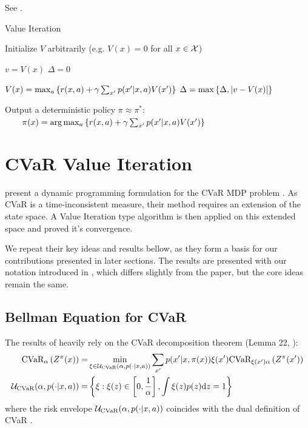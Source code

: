 See .


\begin{algorithm}
\caption{Value Iteration}
\label{alg:vi}
\begin{algorithmic}
    \STATE Initialize $V$ arbitrarily (e.g. $V(x)=0$ for all $x \in \mathcal{X}$)
    
	\REPEAT
	
	\STATE $v = V(x)$
	\STATE $\Delta = 0$
	
	\STATE $V(x) = \max_a\left\{ {r(x, a) + \gamma\sum_{x'}p(x'|x, a)V(x')} \right\}$
	\STATE $\Delta = \max\left\{ {\Delta, |v-V(x)|} \right\}$
	\ENDFOR
	
	\UNTIL{ $\Delta < \epsilon$ }
	
	\STATE Output a deterministic policy $\pi \approx \pi^*$:
   	\STATE $\quad\quad \pi(x) = \text{arg}\max_a\left\{ {r(x, a) + \gamma\sum_{x'}p(x'|x, a)V(x')} \right\}$
\end{algorithmic}
\end{algorithm}


\section{CVaR Value Iteration}\label{sec:vi:cvar}

\citet{chow2015risk} present a dynamic programming formulation for the CVaR MDP problem . As CVaR is a time-inconsistent measure, their method requires an extension of the state space. A Value Iteration type algorithm is then applied on this extended space and \citet{chow2015risk} proved it's convergence. 

We repeat their key ideas and results bellow, as they form a basis for our contributions presented in later sections. The results are presented with our notation introduced in , which differs slightly from the paper, but the core ideas remain the same.

\subsection{Bellman Equation for CVaR}

The results of \citet{chow2015risk} heavily rely on the CVaR decomposition theorem (Lemma 22, \citep{pflug2016time}):
%
\begin{equation}\label{eqn:cvardecomp}
\begin{split}
\text{CVaR}_\alpha\left( {Z^\pi(x)} \right) =& \min_{\xi \in \mathcal{U}_{\text{CVaR}}(\alpha, p(\cdot | x, a))} \sum_{x'} p(x'| x, \pi(x))\xi(x') \text{CVaR}_{\xi(x')\alpha}\left( {Z^\pi(x')} \right)\\
\mathcal{U}_{\text{CVaR}}(\alpha, p(\cdot | x, a)) =& \left\{ {\xi : \xi(z) \in \left[ {0, \frac{1}{\alpha}} \right], \int \xi(z)p(z) \text{d}z = 1} \right\}
\end{split}
\end{equation}
%
where the risk envelope $\mathcal{U}_{\text{CVaR}}(\alpha, p(\cdot | x, a))$ coincides with the dual definition of CVaR .

